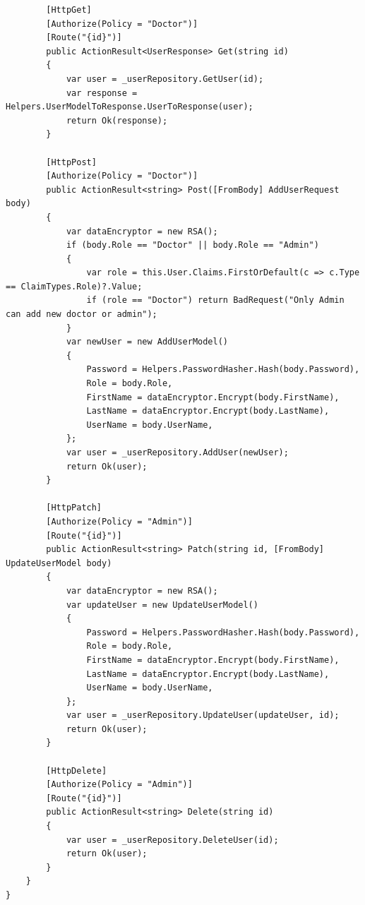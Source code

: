 \documentclass[12pt,a4paper]{article}
\begin{document}
\begin{lstlisting}
        [HttpGet]
        [Authorize(Policy = "Doctor")]
        [Route("{id}")]
        public ActionResult<UserResponse> Get(string id)
        {
            var user = _userRepository.GetUser(id);
            var response = Helpers.UserModelToResponse.UserToResponse(user);
            return Ok(response);
        }

        [HttpPost]
        [Authorize(Policy = "Doctor")]
        public ActionResult<string> Post([FromBody] AddUserRequest body)
        {
            var dataEncryptor = new RSA();
            if (body.Role == "Doctor" || body.Role == "Admin")
            {
                var role = this.User.Claims.FirstOrDefault(c => c.Type == ClaimTypes.Role)?.Value;
                if (role == "Doctor") return BadRequest("Only Admin can add new doctor or admin");
            }
            var newUser = new AddUserModel()
            {
                Password = Helpers.PasswordHasher.Hash(body.Password),
                Role = body.Role,
                FirstName = dataEncryptor.Encrypt(body.FirstName),
                LastName = dataEncryptor.Encrypt(body.LastName),
                UserName = body.UserName,
            };
            var user = _userRepository.AddUser(newUser);
            return Ok(user);
        }
        
        [HttpPatch]
        [Authorize(Policy = "Admin")]
        [Route("{id}")]
        public ActionResult<string> Patch(string id, [FromBody] UpdateUserModel body)
        {
            var dataEncryptor = new RSA();
            var updateUser = new UpdateUserModel()
            {
                Password = Helpers.PasswordHasher.Hash(body.Password),
                Role = body.Role,
                FirstName = dataEncryptor.Encrypt(body.FirstName),
                LastName = dataEncryptor.Encrypt(body.LastName),
                UserName = body.UserName,
            };
            var user = _userRepository.UpdateUser(updateUser, id);
            return Ok(user);
        }

        [HttpDelete]
        [Authorize(Policy = "Admin")]
        [Route("{id}")]
        public ActionResult<string> Delete(string id)
        {
            var user = _userRepository.DeleteUser(id);
            return Ok(user);
        }
    }
}
	\end{lstlisting}
\end{document}
